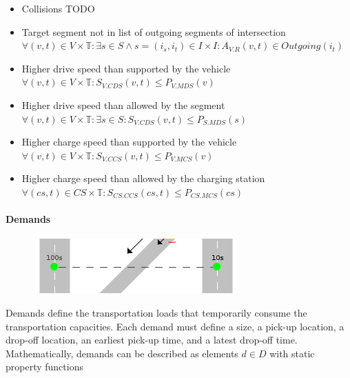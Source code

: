 \documentclass[graybox]{svmult}
\begin{document}
\begin{itemize}
	\item Collisions TODO
	\item Target segment not in list of outgoing segments of intersection $\forall (v,t) \in V \times \mathbb{T}: \exists s \in S \wedge s = (i_s, i_t) \in I \times I: A_{V.R}(v, t) \in Outgoing(i_t)$
	
	\item Higher drive speed than supported by the vehicle $\forall (v,t) \in V \times \mathbb{T}: S_{V.CDS}(v,t) \leq P_{V.MDS}(v)$
	\item Higher drive speed than allowed by the segment $\forall (v,t) \in V \times \mathbb{T}: \exists s \in S: S_{V.CDS}(v,t) \leq P_{S.MDS}(s)$
	\item Higher charge speed than supported by the vehicle $\forall (v,t) \in V \times \mathbb{T}: S_{V.CCS}(v,t) \leq P_{V.MCS}(v)$
	\item Higher charge speed than allowed by the charging station $\forall (cs,t) \in CS \times \mathbb{T}: S_{CS.CCS}(cs,t) \leq P_{CS.MCS}(cs)$
\end{itemize}


\paragraph{Demands}
\begin{figure}
	\centering
		\includegraphics[scale=0.5]{../../concepts/demand.png}
\end{figure}
Demands define the transportation loads that temporarily consume the transportation capacities.
Each demand must define a size, a pick-up location, a drop-off location, an earliest pick-up time, and a latest drop-off time.
Mathematically, demands can be described as elements $d \in D$ with static property functions
\end{document}
